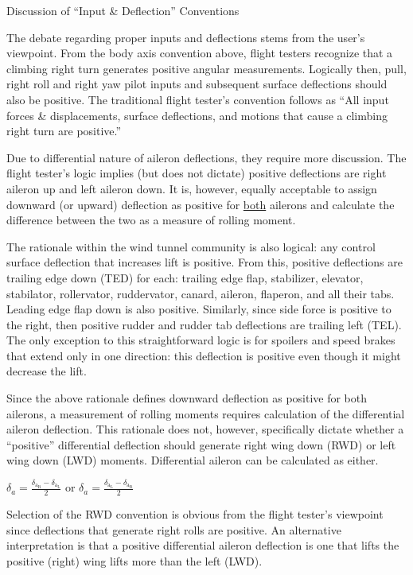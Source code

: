 \documentclass[
]{book}
\begin{document}
Discussion of ``Input \& Deflection'' Conventions

The debate regarding proper inputs and deflections stems from the user's viewpoint. From the body axis convention above, flight testers recognize that a climbing right turn generates positive angular measurements. Logically then, pull, right roll and right yaw pilot inputs and subsequent surface deflections should also be positive. The traditional flight tester's convention follows as ``All input forces \& displacements, surface deflections, and motions that cause a climbing right turn are positive.''

Due to differential nature of aileron deflections, they require more discussion. The flight tester's logic implies (but does not dictate) positive deflections are right aileron up and left aileron down. It is, however, equally acceptable to assign downward (or upward) deflection as positive for \underline{both} ailerons and calculate the difference between the two as a measure of rolling moment.

The rationale within the wind tunnel community is also logical: any control surface deflection that increases lift is positive. From this, positive deflections are trailing edge down (TED) for each: trailing edge flap, stabilizer, elevator, stabilator, rollervator, ruddervator, canard, aileron, flaperon, and all their tabs. Leading edge flap down is also positive. Similarly, since side force is positive to the right, then positive rudder and rudder tab deflections are trailing left (TEL). The only exception to this straightforward logic is for spoilers and speed brakes that extend only in one direction: this deflection is positive even though it might decrease the lift.

Since the above rationale defines downward deflection as positive for both ailerons, a measurement of rolling moments requires calculation of the differential aileron deflection. This rationale does not, however, specifically dictate whether a ``positive'' differential deflection should generate right wing down (RWD) or left wing down (LWD) moments. Differential aileron can be calculated as either.

\(\delta_{a} = \frac{\delta_{\mathrm{a_R}} - \delta_{\mathrm{a_L}}}{2}\) or \(\delta_{a} = \frac{\delta_{\mathrm{a_L}} - \delta_{\mathrm{a_R}}}{2}\)

Selection of the RWD convention is obvious from the flight tester's viewpoint since deflections that generate right rolls are positive. An alternative interpretation is that a positive differential aileron deflection is one that lifts the positive (right) wing lifts more than the left (LWD).
\end{document}
